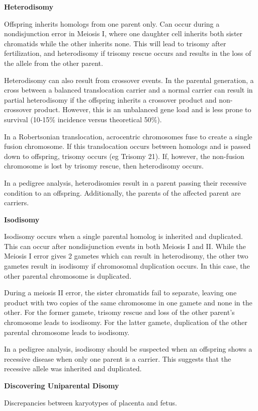 \documentclass{tufte-handout}
\theoremstyle{noparens}
\begin{document}
\textbf{Heterodisomy}

Offspring inherits homologs from one parent only. Can occur during a nondisjunction error in Meiosis I, where one daughter cell inherits both sister chromatids while the other inherits none. This will lead to trisomy after fertilization, and heterodisomy if trisomy rescue occurs and results in the loss of the allele from the other parent.

Heterodisomy can also result from crossover events. In the parental generation, a cross between a balanced translocation carrier and a normal carrier can result in partial heterodisomy if the offspring inherits a crossover product and non-crossover product. However, this is an unbalanced gene load and is less prone to survival (10-15\% incidence versus theoretical 50\%).

In a Robertsonian translocation, acrocentric chromosomes fuse to create a single fusion chromosome. If this translocation occurs between homologs and is passed down to offspring, trisomy occurs (eg Trisomy 21). If, however, the non-fusion chromosome is lost by trisomy rescue, then heterodisomy occurs.

In a pedigree analysis, heterodisomies result in a parent passing their recessive condition to an offspring. Additionally, the parents of the affected parent are carriers. 

\textbf{Isodisomy}

Isodisomy occurs when a single parental homolog is inherited and duplicated. This can occur after nondisjunction events in both Meiosis I and II. While the Meiosis I error gives 2 gametes which can result in heterodisomy, the other two gametes result in isodisomy if chromosomal duplication occurs. In this case, the other parental chromosome is duplicated.

During a meiosis II error, the sister chromatids fail to separate, leaving one product with two copies of the same chromosome in one gamete and none in the other. For the former gamete, trisomy rescue and loss of the other parent's chromosome leads to isodisomy. For the latter gamete, duplication of the other parental chromosome leads to isodisomy.

In a pedigree analysis, isodisomy should be suspected when an offspring shows a recessive disease when only one parent is a carrier. This suggests that the recessive allele was inherited and duplicated.
 
 \textbf{Discovering Uniparental Disomy}
 
 Discrepancies between karyotypes of placenta and fetus.
 
\end{document}
